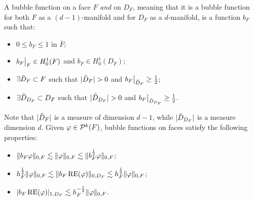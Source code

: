 A bubble function on a face $F$ \emph{and} on $D_F$, meaning that it is a bubble function for both $F$ as a $(d-1)$-manifold and for $D_F$ as a $d$-manifold, is a function $b_F$ such that:
\begin{itemize}
    \item $0 \le b_F \le 1$ in $\overline{F}$;
    \item $\restr{b_F}{F} \in H^1_0(F)$ and $b_F \in H^1_0(D_F)$;
    \item $\exists \Tilde{D}_F\subset F$ such that $\abs{\Tilde{D}_F}>0$ and $\restr{b_F}{\Tilde{D}_F} \ge \frac{1}{2}$;
    \item $\exists \Tilde{D}_{D_F}\subset D_F$ such that $\abs{\Tilde{D}_{D_F}}>0$ and $\restr{b_F}{\Tilde{D}_{D_F}} \ge \frac{1}{2}$.
\end{itemize}
Note that $\abs{\Tilde{D}_F}$ is a measure of dimension $d-1$, while $\abs{\Tilde{D}_{D_F}}$ is a measure dimension $d$. Given $\phi \in \P^k(F)$, bubble functions on faces satisfy the following properties:
\begin{itemize}
    \item $\norm{b_F \phi}_{0,F} \lesssim \norm{\phi}_{0,F} \lesssim \norm{b_F^{\frac{1}{2}} \phi}_{0,F}$;
    \item $h_F^\frac{1}{2} \norm{\phi}_{0,F} \lesssim \norm{b_F \RE(\phi)}_{0,D_F} \lesssim h_F^\frac{1}{2} \norm{\phi}_{0,F}$;
    \item $\abs{b_F \RE(\phi)}_{1,D_F} \lesssim h_F^{-\frac{1}{2}} \norm{\phi}_{0,F}$.
\end{itemize}

